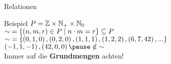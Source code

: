\begin{frame}{Relationen}	
	\begin{exampleblock}{Beispiel}
		$ P = \mathbb{Z} \times \mathbb{N}_+ \times \mathbb{N}_0 $ \\
		$ \text{$\sim$} = \left\{\left(n, m, r\right) \in P \;\middle|\; n \cdot m = r \right\} \subseteq P $ \\[0.5em]
		\pause
		$ \text{$\sim$} = \left\{\left(0, 1, 0\right), \left(0, 2, 0\right), \left(1, 1, 1\right), \left(1, 2, 2\right), \left(6, 7, 42\right), ...\right\} $ \\[0.5em]
		$ \tuple{-1, 1, -1}, \tuple{42, 0, 0} \pause \notin \normalvar{\sim} $\\[1em]
		\pause
		\impl Immer auf die \textbf{Grundmengen} achten!
	\end{exampleblock}
\end{frame}